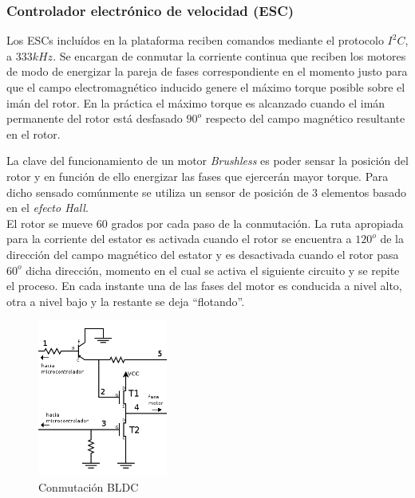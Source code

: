 \documentclass[main]{subfiles}
\begin{document}
\subsubsection*{Controlador electrónico de velocidad (ESC)}

Los ESCs inclu\'idos en la plataforma reciben comandos mediante el protocolo $I^2C$, a $333kHz$. Se encargan de conmutar la corriente continua que reciben los motores de modo de energizar la pareja de fases correspondiente en el momento justo para que el campo electromagnético inducido genere el máximo torque posible sobre el imán del rotor. En la práctica el máximo torque es alcanzado cuando el imán permanente del rotor está desfasado $90^o$ respecto del campo magnético resultante en el rotor.

La clave del funcionamiento de un motor \emph{Brushless} es poder sensar la posición del rotor y en función de ello energizar las fases que ejercerán mayor torque. Para dicho sensado comúnmente se utiliza un sensor de posición de 3 elementos basado en el \emph{efecto Hall}.\\

El rotor se mueve 60 grados por cada paso de la conmutación. La ruta apropiada para la corriente del estator es activada cuando el rotor se encuentra a $120^o$ de la dirección del campo magnético del estator y es desactivada cuando el rotor pasa $60^o$ dicha dirección, momento en el cual se activa el siguiente circuito y se repite el proceso. En cada instante una de las fases del motor es conducida a nivel alto, otra a nivel bajo y la restante se deja ``flotando''.\\

\begin{figure}
\vspace{-20pt}
	\centering
		\includegraphics[width=0.38\textwidth]{./pics_eleccion_hardware/bldc_control.png}
\vspace{-10pt}
	\caption{Conmutación BLDC}
	\label{fig:bldc_control}
\end{figure}
\end{document}

